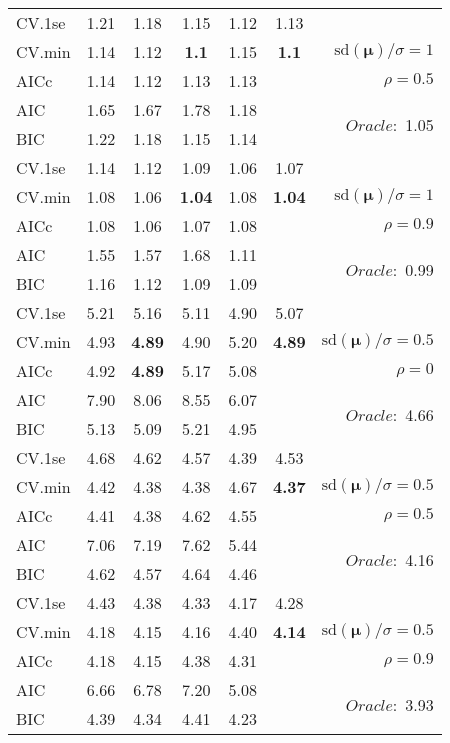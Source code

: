 \begin{table}
\begin{center}
\begin{tabular}{l*{5}{c}|r}
 \hline 
CV.1se & 1.21 & 1.18 & 1.15 & 1.12 & 1.13 & \\
CV.min & 1.14 & 1.12 & {\bf 1.1} & 1.15 & {\bf 1.1} &  $\mathrm{sd}(\mathbf{\mu})/\sigma=1$ \\
AICc & 1.14 & 1.12 & 1.13 & 1.13 & & $\rho=0.5$ \\
AIC & 1.65 & 1.67 & 1.78 & 1.18 & &  \multirow{2}{*}{$Oracle: $ 1.05} \\
BIC & 1.22 & 1.18 & 1.15 & 1.14 & &  \\
 \hline 
CV.1se & 1.14 & 1.12 & 1.09 & 1.06 & 1.07 & \\
CV.min & 1.08 & 1.06 & {\bf 1.04} & 1.08 & {\bf 1.04} &  $\mathrm{sd}(\mathbf{\mu})/\sigma=1$ \\
AICc & 1.08 & 1.06 & 1.07 & 1.08 & & $\rho=0.9$ \\
AIC & 1.55 & 1.57 & 1.68 & 1.11 & &  \multirow{2}{*}{$Oracle: $ 0.99} \\
BIC & 1.16 & 1.12 & 1.09 & 1.09 & &  \\
 \hline 
CV.1se & 5.21 & 5.16 & 5.11 & 4.90 & 5.07 & \\
CV.min & 4.93 & {\bf 4.89} & 4.90 & 5.20 & {\bf 4.89} &  $\mathrm{sd}(\mathbf{\mu})/\sigma=0.5$ \\
AICc & 4.92 & {\bf 4.89} & 5.17 & 5.08 & & $\rho=0$ \\
AIC & 7.90 & 8.06 & 8.55 & 6.07 & &  \multirow{2}{*}{$Oracle: $ 4.66} \\
BIC & 5.13 & 5.09 & 5.21 & 4.95 & &  \\
 \hline 
CV.1se & 4.68 & 4.62 & 4.57 & 4.39 & 4.53 & \\
CV.min & 4.42 & 4.38 & 4.38 & 4.67 & {\bf 4.37} &  $\mathrm{sd}(\mathbf{\mu})/\sigma=0.5$ \\
AICc & 4.41 & 4.38 & 4.62 & 4.55 & & $\rho=0.5$ \\
AIC & 7.06 & 7.19 & 7.62 & 5.44 & &  \multirow{2}{*}{$Oracle: $ 4.16} \\
BIC & 4.62 & 4.57 & 4.64 & 4.46 & &  \\
 \hline 
CV.1se & 4.43 & 4.38 & 4.33 & 4.17 & 4.28 & \\
CV.min & 4.18 & 4.15 & 4.16 & 4.40 & {\bf 4.14} &  $\mathrm{sd}(\mathbf{\mu})/\sigma=0.5$ \\
AICc & 4.18 & 4.15 & 4.38 & 4.31 & & $\rho=0.9$ \\
AIC & 6.66 & 6.78 & 7.20 & 5.08 & &  \multirow{2}{*}{$Oracle: $ 3.93} \\
BIC & 4.39 & 4.34 & 4.41 & 4.23 & &  \\
 \hline 
\end{tabular}
\end{center}
\vspace{-1cm}
\end{table}




